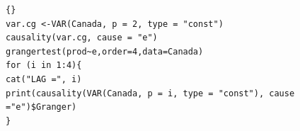 
%		
%		
\begin{lstlisting}[title={‘Código R: Ejemplo Modelo VAR - Test de Causalidad de Granger},basicstyle=\ttfamily]{}
var.cg <-VAR(Canada, p = 2, type = "const")
causality(var.cg, cause = "e")
grangertest(prod~e,order=4,data=Canada)
for (i in 1:4){
cat("LAG =", i)
print(causality(VAR(Canada, p = i, type = "const"), cause ="e")$Granger)
}
\end{lstlisting}


